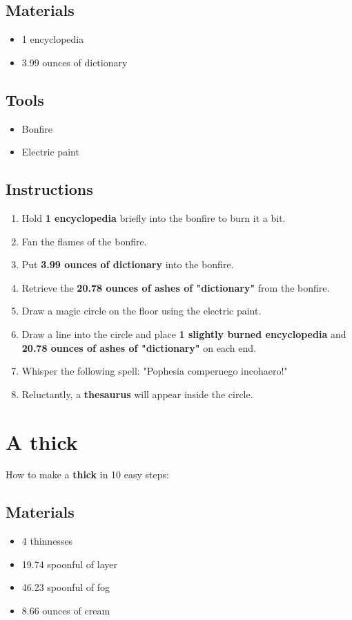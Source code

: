 \documentclass{article}
\begin{document}
\subsection{Materials}\begin{itemize}
\item 
1 encyclopedia
\item 
3.99 ounces of dictionary
\end{itemize}
\subsection{Tools}\begin{itemize}
\item 
Bonfire
\item 
Electric paint
\end{itemize}
\subsection{Instructions}\begin{enumerate}
\item 
Hold \textbf{1 encyclopedia} briefly into the bonfire to burn it a bit.
\item 
Fan the flames of the bonfire.
\item 
Put \textbf{3.99 ounces of dictionary} into the bonfire.
\item 
Retrieve the \textbf{20.78 ounces of ashes of "dictionary"} from the bonfire.
\item 
Draw a magic circle on the floor using the electric paint.
\item 
Draw a line into the circle and place \textbf{1 slightly burned encyclopedia} and \textbf{20.78 ounces of ashes of "dictionary"} on each end.
\item 
Whisper the following spell: "Pophesia compernego incohaero!"
\item 
Reluctantly, a \textbf{thesaurus} will appear inside the circle.
\end{enumerate}
\newpage
\section{A thick}How to make a \textbf{thick} in 10 easy steps:

\subsection{Materials}\begin{itemize}
\item 
4 thinnesses
\item 
19.74 spoonful of layer
\item 
46.23 spoonful of fog
\item 
8.66 ounces of cream
\end{itemize}
\end{document}
